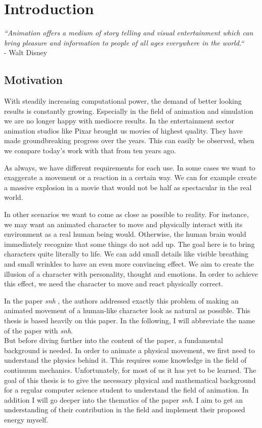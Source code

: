\chapter{Introduction}
\textit{``Animation offers a medium of story telling and visual entertainment which can bring pleasure and information to people of all ages everywhere in the world.``} \\
- Walt Disney


\section{Motivation}
With steadily increasing computational power, the demand of better looking results is constantly growing. Especially in the field of animation and simulation we are no longer happy with mediocre results. 
In the entertainment sector animation studios like Pixar\textsuperscript{\textcopyright} brought us movies of highest quality. They have made groundbreaking progress over the years. This can easily be observed, when we compare today's work with that from ten years ago. 

As always, we have different requirements for each use.
In some cases we want to exaggerate a movement or a reaction in a certain way. We can for example create a massive explosion in a movie that would not be half as spectacular in the real world. 

In other scenarios we want to come as close as possible to reality. For instance, we may want an animated character to move and physically interact with its environment as a real human being would. Otherwise, the human brain would immediately recognize that some things do not add up.
The goal here is to bring characters quite literally to life. We can add small details like visible breathing and small wrinkles to have an even more convincing effect. We aim to create the illusion of a character with personality, thought and emotions. In order to achieve this effect, we need the character to move and react physically correct. 

In the paper \textit{\acrlong{snh}} \cite{Smith:2018:SNF:3191713.3180491}, the authors addressed exactly this problem of making an animated movement of a human-like character look as natural as possible. This thesis is based heavily on this paper. In the following, I will abbreviate the name of the paper with \textit{\acrshort{snh}}. \\
But before diving further into the content of the paper, a fundamental background is needed. In order to animate a physical movement, we first need to understand the physics behind it. This requires some knowledge in the field of continuum mechanics. Unfortunately, for most of us it has yet to be learned. The goal of this thesis is to give the necessary physical and mathematical background for a regular computer science student to understand the field of animation. In addition I will go deeper into the thematics of the paper \textit{\acrshort {snh}}. I aim to get an understanding of their contribution in the field and implement their proposed energy myself.


